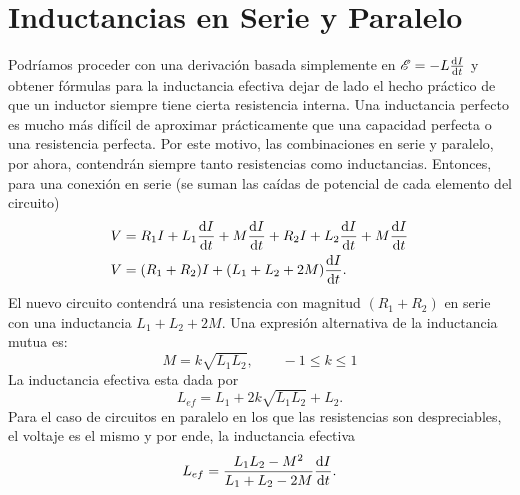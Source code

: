 \section{Inductancias en Serie y Paralelo}
Podríamos proceder con una derivación basada simplemente en $\mathscr{E} = -L\dv{I}{t}$ y obtener fórmulas para la inductancia efectiva dejar de lado el hecho práctico de que un inductor siempre tiene cierta resistencia interna. Una inductancia perfecto es mucho más difícil de aproximar prácticamente que una capacidad perfecta o una resistencia perfecta. Por este motivo, las combinaciones en serie y paralelo, por ahora, contendrán siempre tanto resistencias como inductancias. Entonces, para una conexión en serie (se suman las caídas de potencial de cada elemento del circuito)
\begin{align}
    V &= R_1 I + L_1 \dv{I}{t} + M\dv{I}{t} + R_2 I + L_2 \dv{I}{t} + M\dv{I}{t} \\
    V &= \qty(R_1 + R_2) I + \qty(L_1 + L_2 + 2M) \dv{I}{t}.
\end{align}
El nuevo circuito contendrá una resistencia con magnitud $(R_1 + R_2)$ en serie con una inductancia $L_1 + L_2 + 2M$. Una expresión alternativa de la inductancia mutua es:
\begin{equation}
    M = k\sqrt{L_1 L_2}, \qquad -1\leq k \leq 1
\end{equation}
La inductancia efectiva esta dada por
\begin{equation}
    L_{ef} = L_1 + 2k\sqrt{L_1 L_2} + L_2.
\end{equation}
Para el caso de circuitos en paralelo en los que las resistencias son despreciables, el voltaje es el mismo y por ende, la inductancia efectiva
\begin{equation}
    L_{ef} = \frac{L_1 L_2 - M^2}{L_1 + L_2 - 2M} \dv{I}{t}.
\end{equation}





